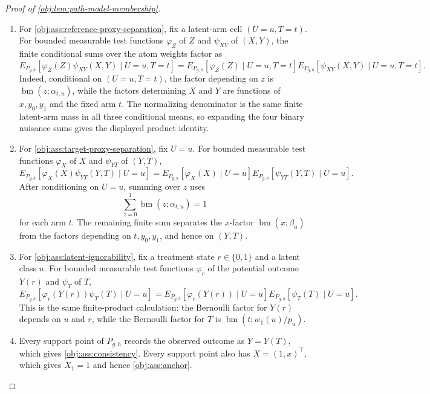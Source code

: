 \documentclass[11pt]{article}
\begin{document}
\begin{proof}[Proof of \cref{obj:lem:path-model-membership}]
\begin{enumerate}
\item For \cref{obj:ass:reference-proxy-separation}, fix a latent-arm cell \((U=u,T=t)\).  For bounded measurable test functions \(\varphi_Z\) of \(Z\) and \(\psi_{XY}\) of \((X,Y)\), the finite conditional sums over the atom weights factor as
\[
E_{P_{g,h}}\!\left[
\varphi_Z(Z)\psi_{XY}(X,Y)\mid U=u,T=t
\right]
=
E_{P_{g,h}}\!\left[
\varphi_Z(Z)\mid U=u,T=t
\right]
E_{P_{g,h}}\!\left[
\psi_{XY}(X,Y)\mid U=u,T=t
\right].
\]
Indeed, conditional on \((U=u,T=t)\), the factor depending on \(z\) is
\(\operatorname{bm}(z;\alpha_{t,u})\), while the factors determining \(X\) and \(Y\) are functions of \(x,y_0,y_1\) and the fixed arm \(t\).  The normalizing denominator is the same finite latent-arm mass in all three conditional means, so expanding the four binary nuisance sums gives the displayed product identity. %

\item For \cref{obj:ass:target-proxy-separation}, fix \(U=u\).  For bounded measurable test functions \(\varphi_X\) of \(X\) and \(\psi_{YT}\) of \((Y,T)\),
\[
E_{P_{g,h}}\!\left[
\varphi_X(X)\psi_{YT}(Y,T)\mid U=u
\right]
=
E_{P_{g,h}}\!\left[
\varphi_X(X)\mid U=u
\right]
E_{P_{g,h}}\!\left[
\psi_{YT}(Y,T)\mid U=u
\right].
\]
After conditioning on \(U=u\), summing over \(z\) uses
\[
\sum_{z=0}^1\operatorname{bm}(z;\alpha_{t,u})=1
\]
for each arm \(t\).  The remaining finite sum separates the \(x\)-factor \(\operatorname{bm}(x;\beta_u)\) from the factors depending on \(t,y_0,y_1\), and hence on \((Y,T)\). %

\item For \cref{obj:ass:latent-ignorability}, fix a treatment state \(r\in\{0,1\}\) and a latent class \(u\).  For bounded measurable test functions \(\varphi_r\) of the potential outcome \(Y(r)\) and \(\psi_T\) of \(T\),
\[
E_{P_{g,h}}\!\left[
\varphi_r(Y(r))\psi_T(T)\mid U=u
\right]
=
E_{P_{g,h}}\!\left[
\varphi_r(Y(r))\mid U=u
\right]
E_{P_{g,h}}\!\left[
\psi_T(T)\mid U=u
\right].
\]
This is the same finite-product calculation: the Bernoulli factor for \(Y(r)\) depends on \(u\) and \(r\), while the Bernoulli factor for \(T\) is \(\operatorname{bm}(t;w_1(u)/p_u)\). %

\item Every support point of \(P_{g,h}\) records the observed outcome as \(Y=Y(T)\), which gives \cref{obj:ass:consistency}.  Every support point also has \(X=(1,x)^\top\), which gives \(X_1=1\) and hence \cref{obj:ass:anchor}. %


\end{enumerate}
\end{proof}
\end{document}
